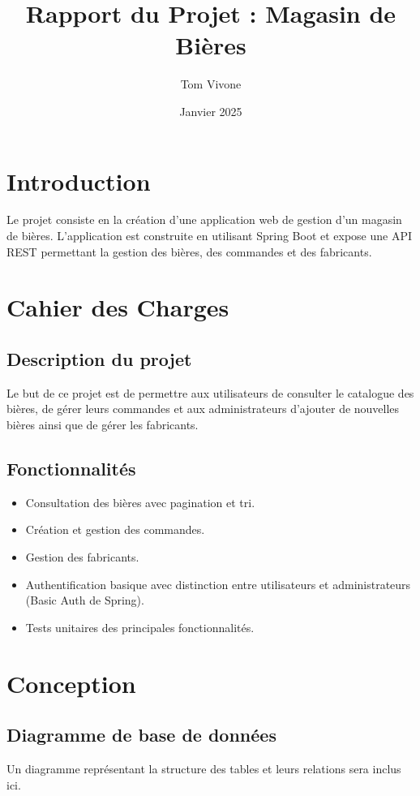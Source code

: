 \documentclass{article}
\title{Rapport du Projet : Magasin de Bières}
\author{Tom Vivone}
\date{Janvier 2025}
\begin{document}
\maketitle

\section{Introduction}

Le projet consiste en la création d'une application web de gestion d'un magasin de bières.
L'application est construite en utilisant Spring Boot et expose une API REST permettant la gestion des bières, des commandes et des fabricants.

\section{Cahier des Charges}

\subsection{Description du projet}
Le but de ce projet est de permettre aux utilisateurs de consulter le catalogue des bières, de gérer leurs commandes et aux administrateurs d'ajouter de nouvelles bières ainsi que de gérer les fabricants.

\subsection{Fonctionnalités}
\begin{itemize}
    \item Consultation des bières avec pagination et tri.
    \item Création et gestion des commandes.
    \item Gestion des fabricants.
    \item Authentification basique avec distinction entre utilisateurs et administrateurs (Basic Auth de Spring).
    \item Tests unitaires des principales fonctionnalités.
\end{itemize}

\section{Conception}

\subsection{Diagramme de base de données}
Un diagramme représentant la structure des tables et leurs relations sera inclus ici.
\end{document}
